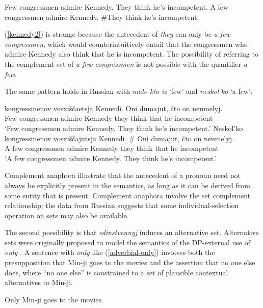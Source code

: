 \begin{exe}
	\ex \label{kennedy} Few congressmen admire Kennedy. They think he's incompetent.
	\ex \label{kennedy2} A few congressmen admire Kennedy. \#They think he's incompetent.
\end{exe}

(\ref{kennedy2}) is strange because the antecedent of \textit{they} can only be \textit{a few congressmen}, which would counterintuitively entail that the congressmen who admire Kennedy also think that he is incompetent. The possibility of referring to the complement set of \textit{a few congressmen} is not possible with the quantifier \textit{a few}.

The same pattern holds in Russian with \textit{malo kto iz} `few' and \textit{neskol'ko} `a few':

\begin{exe}
	\ex {} kongressmenov vosxi\v{s}\v{c}aetsja Kennedi. Oni dumajut, \v{c}to on neumelyj.\\
	Few congressmen admire Kennedy they think that he incompetent\\
	\glt `Few congressmen admire Kennedy. They think he's incompetent.'
	\ex \gll Neskol'ko kongressmenov vosxi\v{s}\v{c}ajutsja Kennedi. \# Oni dumajut, \v{c}to on neumelyj.\\
	{A few} congressmen admire Kennedy {} they think that he incompetent\\
	\glt `A few congressmen admire Kennedy. They think he's incompetent.'
\end{exe}

Complement anaphora illustrate that the antecedent of a pronoun need not always be explicitly present in the semantics, as long as it can be derived from some entity that is present. Complement anaphora involve the set complement relationship; the data from Russian suggests that some individual-selection operation on sets may also be available.

The second possibility is that \textit{edinstvennyj} induces an alternative set. Alternative sets were originally proposed to model the semantics of the DP-external use of \textit{only} \citep{rooth85, rooth92}.
A sentence with \textit{only} like (\ref{adverbial-only}) involves both the presupposition that Min-ji goes to the movies and the assertion that no one else does, where ``no one else'' is constrained to a set of plausible contextual alternatives to Min-ji.

\begin{exe}
	\ex \label{adverbial-only} Only Min-ji goes to the movies.
\end{exe}


